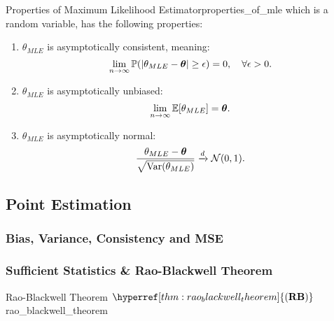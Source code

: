 \begin{proof*}
\begin{proposition}{Properties of Maximum Likelihood Estimator}{properties_of_mle}
    \noindent which is a random variable, has the following properties:
    \begin{enumerate}
        \item $\theta_{MLE}$ is asymptotically consistent, meaning:
        \begin{equation}
            \lim_{n\to\infty} \mathbb{P}(|\theta_{MLE} - \boldsymbol{\theta}| \ge \epsilon) = 0, \quad \forall\epsilon>0.
        \end{equation}
        \item $\theta_{MLE}$ is asymptotically unbiased:
        \begin{equation}
            \lim_{n\to\infty}\mathbb{E}[\theta_{MLE}] = \boldsymbol{\theta}.
        \end{equation}
        \item $\theta_{MLE}$ is asymptotically normal:
        \begin{equation}
            \frac{\theta_{MLE} - \boldsymbol{\theta}}{\sqrt{\mathrm{Var}(\theta_{MLE})}} \xrightarrow{d} \mathcal{N}(0,1).
        \end{equation}
    \end{enumerate} 
\end{proposition} 


\subsection{Point Estimation}
\newcommand{\RB}{\hyperref[thm:rao_blackwell_theorem]{(\mathrm{{\bf RB}})}}
\newcommand{\CRLB}{\hyperref[thm:cramer_rao_lowerbound]{(\mathrm{{\bf CRLB}})}}

\subsubsection{Bias, Variance, Consistency and MSE}

\subsubsection{Sufficient Statistics \& Rao-Blackwell Theorem}
\begin{theorem}{Rao-Blackwell Theorem $\RB$}{rao_blackwell_theorem}
     
\end{theorem}



\end{proof*}
